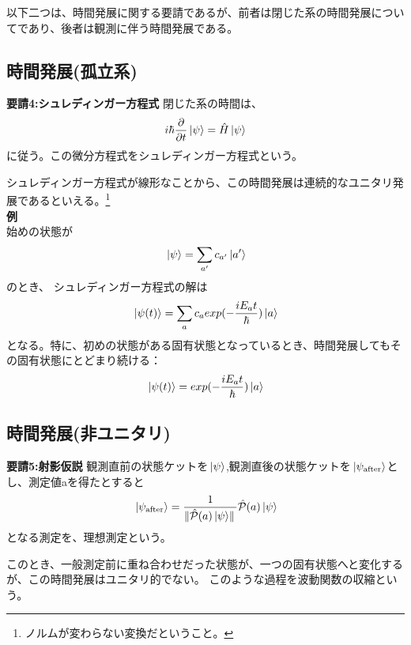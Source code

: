 \documentclass[a4paper,11pt]{jsarticle}
\begin{document}
以下二つは、時間発展に関する要請であるが、前者は閉じた系の時間発展についてであり、後者は観測に伴う時間発展である。
\subsection{時間発展(孤立系)}
\begin{itembox}[l]{\textbf {要請4:シュレディンガー方程式}}
閉じた系の時間は、
\begin{align}
    i\hbar \pdv{t}\ket*{\psi} = \hat{H} \ket*{\psi}
\end{align}
に従う。この微分方程式をシュレディンガー方程式という。
    \end{itembox}
シュレディンガー方程式が線形なことから、この時間発展は連続的なユニタリ発展であるといえる。\footnote[1]{ノルムが変わらない変換だということ。}\\
\textbf{例}\\
始めの状態が
\begin{align}
    \ket*{\psi} = \sum_{a'} c_{a'}\ket*{a'}
\end{align}
のとき、
シュレディンガー方程式の解は
\begin{align}
    \ket*{\psi(t)}=\sum_a c_a exp(-\frac{iE_a t}{\hbar})\ket*{a}
\end{align}
となる。特に、初めの状態がある固有状態となっているとき、時間発展してもその固有状態にとどまり続ける：\\
\begin{align}
    \ket*{\psi(t)}=exp(-\frac{iE_a t}{\hbar})\ket*{a}
\end{align}
\subsection{時間発展(非ユニタリ)}
\begin{itembox}[l]{\textbf {要請5:射影仮説}}
観測直前の状態ケットを$\ket*{\psi}$,観測直後の状態ケットを$\ket*{\psi_{\mathrm{after}}}$とし、測定値aを得たとすると
\begin{align}
\ket*{\psi_{\mathrm{after}}}=\frac{1}{\norm*{\hat{\mathcal{P}}(a)\ket*{\psi}}}\hat{\mathcal{P}}(a)\ket*{\psi}
\end{align}
となる測定を、理想測定という。
    \end{itembox}
このとき、一般測定前に重ね合わせだった状態が、一つの固有状態へと変化するが、この時間発展はユニタリ的でない。
このような過程を波動関数の収縮という。\\
\end{document}
